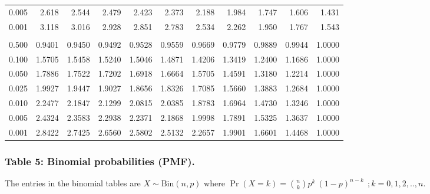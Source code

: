 \documentclass[
]{article}
\begin{document}
\begin{longtable}[t]{lrrrrrrrrrr}
\hspace{1em}0.005 & 2.618 & 2.544 & 2.479 & 2.423 & 2.373 & 2.188 & 1.984 & 1.747 & 1.606 & 1.431\\
\hspace{1em}0.001 & 3.118 & 3.016 & 2.928 & 2.851 & 2.783 & 2.534 & 2.262 & 1.950 & 1.767 & 1.543\\
\addlinespace[0.3em]
\multicolumn{11}{l}{$k_2=\infty$}\\
\hspace{1em}0.500 & 0.9401 & 0.9450 & 0.9492 & 0.9528 & 0.9559 & 0.9669 & 0.9779 & 0.9889 & 0.9944 & 1.0000\\
\hspace{1em}0.100 & 1.5705 & 1.5458 & 1.5240 & 1.5046 & 1.4871 & 1.4206 & 1.3419 & 1.2400 & 1.1686 & 1.0000\\
\hspace{1em}0.050 & 1.7886 & 1.7522 & 1.7202 & 1.6918 & 1.6664 & 1.5705 & 1.4591 & 1.3180 & 1.2214 & 1.0000\\
\hspace{1em}0.025 & 1.9927 & 1.9447 & 1.9027 & 1.8656 & 1.8326 & 1.7085 & 1.5660 & 1.3883 & 1.2684 & 1.0000\\
\hspace{1em}0.010 & 2.2477 & 2.1847 & 2.1299 & 2.0815 & 2.0385 & 1.8783 & 1.6964 & 1.4730 & 1.3246 & 1.0000\\
\hspace{1em}0.005 & 2.4324 & 2.3583 & 2.2938 & 2.2371 & 2.1868 & 1.9998 & 1.7891 & 1.5325 & 1.3637 & 1.0000\\
\hspace{1em}0.001 & 2.8422 & 2.7425 & 2.6560 & 2.5802 & 2.5132 & 2.2657 & 1.9901 & 1.6601 & 1.4468 & 1.0000\\
\bottomrule
\end{longtable}

\newpage

\subsubsection{Table 5: Binomial probabilities
(PMF).}\label{table-5-binomial-probabilities-pmf.}

The entries in the binomial tables are \(X\sim\text{Bin}(n,p)\) where
\(\Pr(X=k)= \binom{n}{k}p^k\ (1-p)^{n-k} \ \ ; k=0, 1, 2, .., n\).
\end{document}

